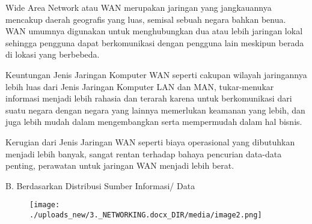 \documentclass{wileySix}
\begin{document}
\par
Wide Area Network atau WAN merupakan jaringan yang jangkauannya mencakup daerah geografis yang luas, semisal sebuah negara bahkan benua. WAN umumnya digunakan untuk menghubungkan dua atau lebih jaringan lokal sehingga pengguna dapat berkomunikasi dengan pengguna lain meskipun berada di lokasi yang berbebeda. \par
\vspace{12pt}
Keuntungan Jenis Jaringan Komputer WAN seperti cakupan wilayah jaringannya lebih luas dari Jenis Jaringan Komputer LAN dan MAN, tukar-menukar informasi menjadi lebih rahasia dan terarah karena untuk berkomunikasi dari suatu negara dengan negara yang lainnya memerlukan keamanan yang lebih, dan juga lebih mudah dalam mengembangkan serta mempermudah dalam hal bisnis. \par
Kerugian dari Jenis Jaringan WAN seperti biaya operasional yang dibutuhkan menjadi lebih banyak, sangat rentan terhadap bahaya pencurian data-data penting, perawatan untuk jaringan WAN menjadi lebih berat. \par
\vspace{12pt}
\noindent 
B. Berdasarkan Distribusi Sumber Informasi/ Data \par
\noindent 




\begin{figure}[H]
	\begin{center}
		\texttt{[image: ./uploads\_new/3.\_NETWORKING.docx\_DIR/media/image2.png]}
	\end{center}
\end{figure}


\end{document}
